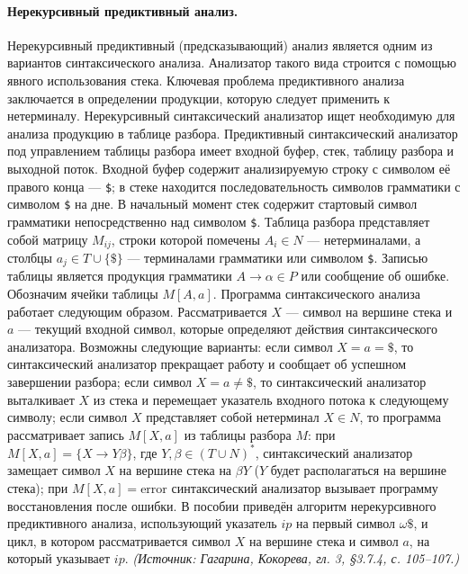 \documentclass[a4paper,12pt]{article}
\begin{document}
\paragraph{Нерекурсивный предиктивный анализ.}
Нерекурсивный предиктивный (предсказывающий) анализ является одним из вариантов синтаксического анализа. Анализатор такого вида строится с помощью явного использования стека. Ключевая проблема предиктивного анализа заключается в определении продукции, которую следует применить к нетерминалу. Нерекурсивный синтаксический анализатор ищет необходимую для анализа продукцию в таблице разбора. Предиктивный синтаксический анализатор под управлением таблицы разбора имеет входной буфер, стек, таблицу разбора и выходной поток. Входной буфер содержит анализируемую строку с символом её правого конца — \texttt{\$}; в стеке находится последовательность символов грамматики с символом \texttt{\$} на дне. В начальный момент стек содержит стартовый символ грамматики непосредственно над символом \texttt{\$}. Таблица разбора представляет собой матрицу \(M_{ij}\), строки которой помечены \(A_i\in N\) — нетерминалами, а столбцы \(a_j\in T\cup\{\$\}\) — терминалами грамматики или символом \texttt{\$}. Записью таблицы является продукция грамматики \(A\to\alpha\in P\) или сообщение об ошибке. Обозначим ячейки таблицы \(M[A,a]\). Программа синтаксического анализа работает следующим образом. Рассматривается \(X\) — символ на вершине стека и \(a\) — текущий входной символ, которые определяют действия синтаксического анализатора. Возможны следующие варианты: если символ \(X=a=\texttt{\$}\), то синтаксический анализатор прекращает работу и сообщает об успешном завершении разбора; если символ \(X=a\ne\texttt{\$}\), то синтаксический анализатор выталкивает \(X\) из стека и перемещает указатель входного потока к следующему символу; если символ \(X\) представляет собой нетерминал \(X\in N\), то программа рассматривает запись \(M[X,a]\) из таблицы разбора \(M\): при \(M[X,a]=\{X\to Y\beta\}\), где \(Y,\beta\in(T\cup N)^*\), синтаксический анализатор замещает символ \(X\) на вершине стека на \(\beta Y\) (\(Y\) будет располагаться на вершине стека); при \(M[X,a]=\text{error}\) синтаксический анализатор вызывает программу восстановления после ошибки. В пособии приведён алгоритм нерекурсивного предиктивного анализа, использующий указатель \(ip\) на первый символ \(\omega\texttt{\$}\), и цикл, в котором рассматривается символ \(X\) на вершине стека и символ \(a\), на который указывает \(ip\).
\textit{(Источник: Гагарина, Кокорева, гл. 3, §3.7.4, с. 105--107.)}
\end{document}
